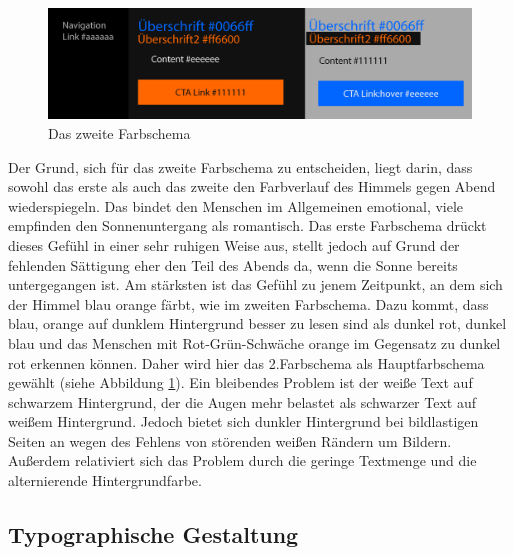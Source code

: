 \begin{figure} [h]
\includegraphics[width=\textwidth]{./img/inno_col2.png}
\caption{Das zweite Farbschema}
\label{inno_Farbschemen2}
\end{figure}

Der Grund, sich für das zweite Farbschema zu entscheiden, liegt darin, dass sowohl das erste als auch das zweite den Farbverlauf des Himmels gegen Abend wiederspiegeln. Das bindet den Menschen im Allgemeinen emotional, viele empfinden den Sonnenuntergang als romantisch. Das erste Farbschema drückt dieses Gefühl in einer sehr ruhigen Weise aus, stellt jedoch auf Grund der fehlenden Sättigung eher den Teil des Abends da, wenn die Sonne bereits untergegangen ist. Am stärksten ist das Gefühl zu jenem Zeitpunkt, an dem sich der Himmel blau orange färbt, wie im zweiten Farbschema. Dazu kommt, dass blau, orange auf dunklem Hintergrund besser zu lesen sind als dunkel rot, dunkel blau und das Menschen mit Rot-Grün-Schwäche orange im Gegensatz zu dunkel rot erkennen können. Daher wird hier das 2.Farbschema als Hauptfarbschema gewählt (siehe Abbildung \ref{inno_Farbschemen2}).
Ein bleibendes Problem ist der weiße Text auf schwarzem Hintergrund, der die Augen mehr belastet als schwarzer Text auf weißem Hintergrund. Jedoch bietet sich dunkler Hintergrund bei bildlastigen Seiten an wegen des Fehlens von störenden weißen Rändern um Bildern. Außerdem relativiert sich das Problem durch die geringe Textmenge und die alternierende Hintergrundfarbe.


	\subsection{Typographische Gestaltung}

